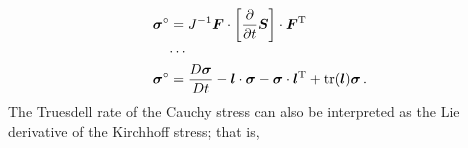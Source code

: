 \documentclass[10pt,letterpaper,oneside]{report}
\newcommand{\ten}[1]{\mbox{\boldmath $#1$}{}}
\newcommand{\scas}[1]{\mbox{{\scriptsize{${\rm{#1}}$}}}{}}
\begin{document}
\begin{align}
\ten{\sigma}^{\circ } ={}& J^{-1} \ten{F} \cdot \left[ \frac{\partial }{\partial t} \ten{S} \right] \cdot \ten{F}^{\scas{T}}
\\
\cdots{}& \notag \\
\ten{\sigma}^{\circ } 
={}& \frac{D \ten{\sigma}}{D t} -  \ten{l} \cdot  \ten{\sigma} -  \ten{\sigma} \cdot \ten{l}^{\scas{T}} + \text{tr} (\ten{l}) \ten{\sigma} \, .
\end{align}
The Truesdell rate of the Cauchy stress can also be interpreted as the Lie derivative of the Kirchhoff stress; that is, 
\end{document}
